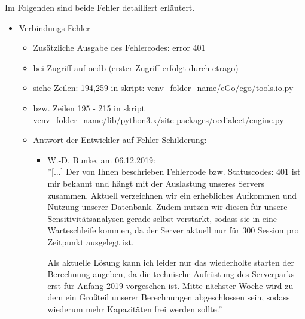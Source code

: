 \documentclass[
a4paper,     %
12pt         %
]{scrartcl}  %
\begin{document}
Im Folgenden sind beide Fehler detailliert erläutert.
\begin{itemize}
	\item Verbindungs-Fehler
	\begin{itemize}
		\begin{lstlisting}
		Traceback (most recent call last):
		File "/home/dafu-vm/ego_venv/lib/python3.6/site-packages/sqlalchemy/pool.py", line 1122, in _do_get
		return self._pool.get(wait, self._timeout)
		File "/home/dafu-vm/ego_venv/lib/python3.6/site-packages/sqlalchemy/util/queue.py", line 145, in get
		raise Empty
		sqlalchemy.util.queue.Empty

		During handling of the above exception, another exception occurred:
		Traceback (most recent call last):
		...
		...
		File "/home/dafu-vm/ego_venv/lib/python3.6/site-packages/oedialect/engine.py", line 213, in post
		raise ConnectionException(json_response['reason'] if 'reason' in json_response else 'No reason returned')
		oedialect.engine.ConnectionException: No reason returned

		\end{lstlisting}
		\item Zusätzliche Ausgabe des Fehlercodes: error 401
		\item[] bei Zugriff auf oedb (erster Zugriff erfolgt durch etrago)
		\item siehe Zeilen: 194,259 in skript: venv\_folder\_name/eGo/ego/tools.io.py
		\item[] bzw. Zeilen 195 - 215 in skript\\ venv\_folder\_name/lib/python3.x/site-packages/oedialect/engine.py
		\item Antwort der Entwickler auf Fehler-Schilderung:
		\begin{itemize}
			\item[]W.-D. Bunke, am 06.12.2019:\\''[...] Der von Ihnen beschrieben Fehlercode bzw. Statuscodes: 401 ist mir bekannt und hängt mit der Auslastung unseres Servers zusammen. Aktuell verzeichnen wir ein erhebliches Aufkommen und Nutzung unserer Datenbank. Zudem nutzen wir diesen für unsere Sensitivitätsanalysen gerade selbst verstärkt, sodass sie in eine Warteschleife kommen, da der Server aktuell nur für 300 Session pro Zeitpunkt ausgelegt ist.

			Als aktuelle Lösung kann ich leider nur das wiederholte starten der Berechnung angeben, da die technische Aufrüstung des Serverparks erst für Anfang 2019 vorgesehen ist. Mitte nächster Woche wird zu dem ein Großteil unserer Berechnungen abgeschlossen sein, sodass wiederum mehr Kapazitäten frei werden sollte.''
		\end{itemize}
	\end{itemize}


\end{itemize}
\end{document}
